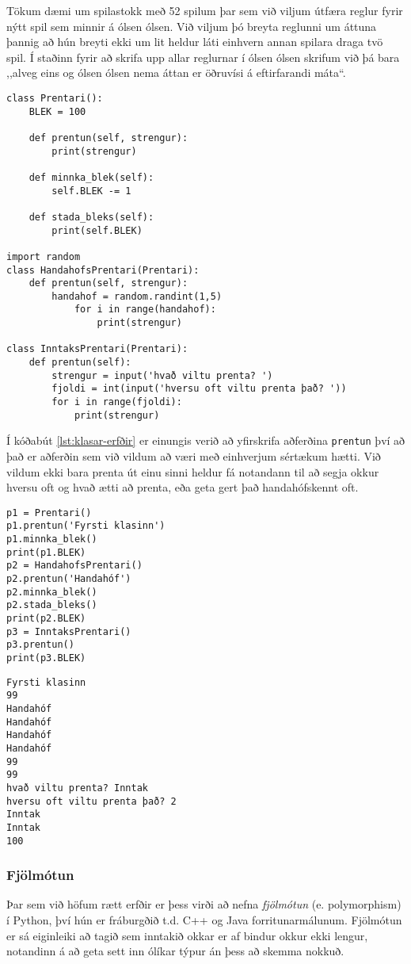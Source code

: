 Tökum dæmi um spilastokk með 52 spilum þar sem við viljum útfæra reglur fyrir nýtt spil sem minnir á ólsen ólsen.
Við viljum þó breyta reglunni um áttuna þannig að hún breyti ekki um lit heldur láti einhvern annan spilara draga tvö spil.
Í staðinn fyrir að skrifa upp allar reglurnar í ólsen ólsen skrifum við þá bara ,,alveg eins og ólsen ólsen nema áttan er öðruvísi á eftirfarandi máta“.
\newpage
\begin{lstlisting}[caption=Erfðir kynntar með klasanum Prentari, label=lst:klasar-erfðir]
class Prentari():
	BLEK = 100
	
	def prentun(self, strengur):
		print(strengur)
	
	def minnka_blek(self):
		self.BLEK -= 1
	
	def stada_bleks(self):
		print(self.BLEK)
		
import random
class HandahofsPrentari(Prentari):
	def prentun(self, strengur):
		handahof = random.randint(1,5)
			for i in range(handahof):
				print(strengur)

class InntaksPrentari(Prentari):
	def prentun(self):
		strengur = input('hvað viltu prenta? ')
		fjoldi = int(input('hversu oft viltu prenta það? '))
		for i in range(fjoldi):
			print(strengur)
\end{lstlisting}

Í kóðabút \ref{lst:klasar-erfðir} er einungis verið að yfirskrifa aðferðina \texttt{prentun} því að það er aðferðin sem við vildum að væri með einhverjum sértækum hætti.
Við vildum ekki bara prenta út einu sinni heldur fá notandann til að segja okkur hversu oft og hvað ætti að prenta, eða geta gert það handahófskennt oft.

\begin{lstlisting}[caption=Prentaraklasarnir notaðir, label=lst:klasar-erfðir-2]
p1 = Prentari()
p1.prentun('Fyrsti klasinn')
p1.minnka_blek()
print(p1.BLEK)
p2 = HandahofsPrentari()
p2.prentun('Handahóf')
p2.minnka_blek()
p2.stada_bleks()
print(p2.BLEK)
p3 = InntaksPrentari()
p3.prentun()
print(p3.BLEK)
\end{lstlisting}
\lstset{style=uttak}
\begin{lstlisting}
Fyrsti klasinn
99
Handahóf
Handahóf
Handahóf
Handahóf
99
99
hvað viltu prenta? Inntak
hversu oft viltu prenta það? 2
Inntak
Inntak
100
\end{lstlisting}
\lstset{style=venjulegt}


\subsubsection{Fjölmótun}
Þar sem við höfum rætt erfðir er þess virði að nefna \emph{fjölmótun} (e. polymorphism) í Python, því hún er fráburgðið t.d. C++ og Java forritunarmálunum.
Fjölmótun er sá eiginleiki að tagið sem inntakið okkar er af bindur okkur ekki lengur, notandinn á að geta sett inn ólíkar týpur án þess að skemma nokkuð.

